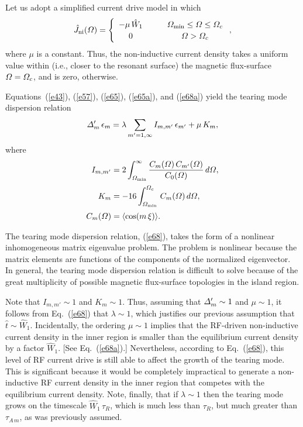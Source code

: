 \documentclass[12pt,prb,aps]{revtex4-1}
\begin{document}
Let us adopt a simplified current drive model in which 
\begin{equation}\label{e68a}
\hat{J}_{\rm ni}({\mit\Omega}) = \left\{
\begin{array}{ccc} -\mu\,\hat{W}_1&~~~&{\mit\Omega}_{\rm min}\leq {\mit\Omega} \leq {\mit\Omega}_c\\[0.5ex]
0&&{\mit\Omega}>{\mit\Omega}_c\end{array}\right.,
\end{equation}
where $\mu$ is a constant. Thus, the non-inductive current density takes a uniform value within (i.e., closer to the resonant surface) the magnetic flux-surface ${\mit\Omega}={\mit\Omega}_c$, and is zero, otherwise. 

Equations~(\ref{e43}), (\ref{e57}), (\ref{e65}), (\ref{e65a}), and (\ref{e68a}) yield the tearing mode dispersion relation
\begin{equation}\label{e68}
{\mit\Delta}_m'\,\epsilon_m = \lambda\sum_{m'=1,\infty}I_{m,m'}\,\epsilon_{m'} + \mu\,K_m,
\end{equation}
where 
\begin{align}
I_{m,m' } &= 2\int_{{\mit\Omega}_{\rm min}}^\infty\frac{C_m({\mit\Omega})\,C_{m'}({\mit\Omega})}{C_0({\mit\Omega})}\,d{\mit\Omega},\\[0.5ex]
K_m &= -16\int_{{\mit\Omega}_{\rm min}}^{\mit\Omega_c}\,C_m({\mit\Omega})
\,d{\mit\Omega},\label{e70}\\[0.5ex]
C_m({\mit\Omega})& = \langle\cos(m\,\xi)\rangle.\label{e72}
\end{align}

The tearing mode dispersion relation, (\ref{e68}), takes the form of a nonlinear inhomogeneous matrix
eigenvalue problem. The problem is nonlinear because the matrix elements are functions of the components of the normalized eigenvector. In general, the tearing mode dispersion relation is difficult to solve because of the great multiplicity of
possible magnetic flux-surface topologies in the island region. 

Note  that $I_{m,m'}\sim 1$ and $K_m\sim 1$. Thus, assuming
that ${\mit\Delta}_m'\sim 1$ and $\mu\sim 1$, it follows from Eq.~(\ref{e68}) that $\lambda\sim 1$, which justifies our previous assumption that $\hat{t}\sim \hat{W}_1$. Incidentally, the ordering  $\mu\sim 1$ implies that the
RF-driven non-inductive  current density in the inner region is smaller than the equilibrium current density by a factor $\hat{W}_1$.
[See Eq.~(\ref{e68a}).]
Nevertheless, according to Eq.~(\ref{e68}), this level of RF current drive is still able to affect the growth of the tearing mode. 
This is significant because it would be completely impractical to generate a non-inductive RF current density
in the inner region that competes with the equilibrium current density.  Note, finally, that if $\lambda\sim 1$ then the tearing mode grows on the timescale $\hat{W}_1\,\tau_R$, which is much less than $\tau_R$, but much greater than
$\tau_{A\,m}$, as was previously assumed. 
\end{document}

